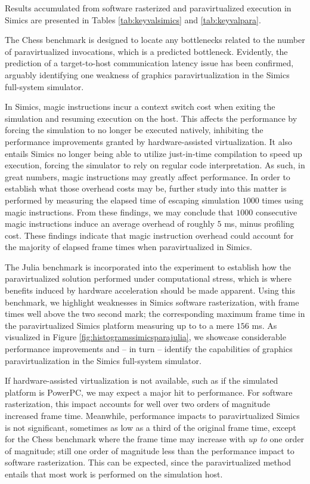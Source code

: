 \documentclass{article}
\begin{document}
Results accumulated from software rasterized and paravirtualized execution in Simics are presented in Tables \ref{tab:keyvalsimics} and \ref{tab:keyvalpara}.

The Chess benchmark is designed to locate any bottlenecks related to the number of paravirtualized invocations, which is a predicted bottleneck.
Evidently, the prediction of a target-to-host communication latency issue has been confirmed, arguably identifying one weakness of graphics paravirtualization in the Simics full-system simulator.

In Simics, magic instructions incur a context switch cost when exiting the simulation and resuming execution on the host.
This affects the performance by forcing the simulation to no longer be executed natively, inhibiting the performance improvements granted by hardware-assisted virtualization.
It also entails Simics no longer being able to utilize just-in-time compilation to speed up execution, forcing the simulator to rely on regular code interpretation.
As such, in great numbers, magic instructions may greatly affect performance.
In order to establish what those overhead costs may be, further study into this matter is performed by measuring the elapsed time of escaping simulation $1000$ times using magic instructions.
From these findings, we may conclude that $1000$ consecutive magic instructions induce an average overhead of roughly $5$ ms, minus profiling cost.
These findings indicate that magic instruction overhead could account for the majority of elapsed frame times when paravirtualized in Simics.

The Julia benchmark is incorporated into the experiment to establish how the paravirtualized solution performed under computational stress, which is where benefits induced by hardware acceleration should be made apparent.
Using this benchmark, we highlight weaknesses in Simics software rasterization, with frame times well above the two second mark; the corresponding maximum frame time in the paravirtualized Simics platform measuring up to to a mere $156$ ms.
As visualized in Figure \ref{fig:histogramssimicsparajulia}, we showcase considerable performance improvements and -- in turn -- identify the capabilities of graphics paravirtualization in the Simics full-system simulator.

If hardware-assisted virtualization is not available, such as if the simulated platform is PowerPC, we may expect a major hit to performance.
For software rasterization, this impact accounts for well over two orders of magnitude increased frame time.
Meanwhile, performance impacts to paravirtualized Simics is not significant, sometimes as low as a third of the original frame time, except for the Chess benchmark where the frame time may increase with \textit{up to} one order of magnitude; still one order of magnitude less than the performance impact to software rasterization.
This can be expected, since the paravirtualized method entails that most work is performed on the simulation host.
\end{document}
